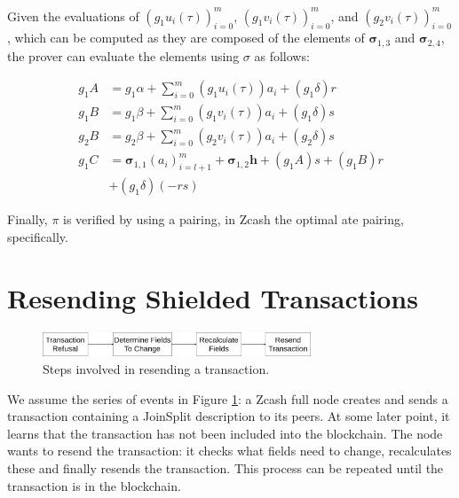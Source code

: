 \documentclass{article}
\begin{document}
Given the evaluations of $(g_1{u_i(\tau)})_{i=0}^m$, $(g_1{v_i(\tau)})_{i=0}^m$, and $(g_2{v_i(\tau)})_{i=0}^m$, which can be computed as they are composed of the elements of $\boldsymbol\sigma_{1,3}$ and $\boldsymbol\sigma_{2,4}$, the prover can evaluate the elements using $\sigma$ as follows:

\begin{align}
        g_1A &= g_1\alpha + \sum_{i=0}^m {(g_1{u_i(\tau)})}{a_i} + {(g_1{\delta})}r \label{eq:gA} \\
        g_1B &= g_1\beta + \sum_{i=0}^m {(g_1{v_i(\tau)})}{a_i} + {(g_1{\delta})}s \label{eq:g1B} \\
        g_2B &= g_2\beta + \sum_{i=0}^m {(g_2{v_i(\tau)})}{a_i} + {(g_2{\delta})}s \label{eq:g2B} \\
        g_1C &= \boldsymbol\sigma_{1,1}(a_i)_{i=l+1}^m + \boldsymbol\sigma_{1,2}\boldsymbol{h} + {(g_1A)}s + {(g_1B)}r \nonumber \\
        &+ {(g_1\delta)}{(-rs)} \label{eq:gC} 
\end{align}

Finally, $\pi$ is verified by using a pairing, in Zcash the optimal ate pairing\cite{vercauteren:optimal-ate}, specifically.

\section{Resending Shielded Transactions} \label{sec:resending}

\begin{figure}[t]
\includegraphics[width=8cm]{images/timeline.png}
\caption{Steps involved in resending a transaction.} \label{fig:resend-steps}
\centering
\end{figure}

We assume the series of events in Figure \ref{fig:resend-steps}: a Zcash full node creates and sends a transaction containing a JoinSplit description to its peers.
At some later point, it learns that the transaction has not been included into the blockchain.
The node wants to resend the transaction: it checks what fields need to change, recalculates these and finally resends the transaction.
This process can be repeated until the transaction is in the blockchain.
\end{document}
